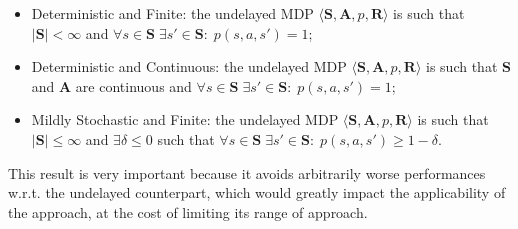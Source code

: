                 \begin{itemize}
                    \item Deterministic and Finite: the undelayed MDP $\langle \mathbf{S}, \mathbf{A}, p, \mathbf{R}\rangle$ is such that $|\mathbf{S}| < \infty$ and $\forall s \in \mathbf{S} \; \exists s' \in \mathbf{S}: \; p(s,a,s') = 1$;
                    \item Deterministic and Continuous: the undelayed MDP $\langle \mathbf{S}, \mathbf{A}, p, \mathbf{R}\rangle$ is such that $\mathbf{S}$ and $\mathbf{A}$ are continuous and $\forall s \in \mathbf{S} \; \exists s' \in \mathbf{S}: \; p(s,a,s') = 1$;
                    \item Mildly Stochastic and Finite: the undelayed MDP $\langle \mathbf{S}, \mathbf{A}, p, \mathbf{R}\rangle$ is such that $|\mathbf{S}| \leq \infty$ and $\exists \delta \leq 0$ such that $\forall s \in \mathbf{S} \; \exists s' \in \mathbf{S}: \; p(s,a,s') \geq 1 - \delta$.
                \end{itemize}
                
                This result is very important because it avoids arbitrarily worse performances w.r.t. the undelayed counterpart, which would greatly impact the applicability of the approach, at the cost of limiting its range of approach.
            
